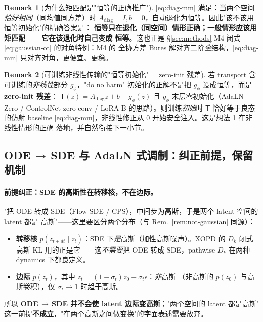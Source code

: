 \documentclass[11pt,a4paper]{article}
\newcommand{\Tmap}{\mathsf{T}}
\theoremstyle{definition}
\newtheorem{remark}{Remark}
\begin{document}
\begin{remark}[为什么矩匹配是"恒等的正确推广"]
\label{rem:mm-is-identity}
\eqref{eq:diag-mm} 满足：当两个空间\emph{恰好相同}（同均值同方差）时
$A_{\mathrm{diag}}=I,b=0$，自动退化为恒等。因此"该不该用恒等初始化"的精确答案是：
\textbf{恒等只在退化（同空间）情形正确；一般情形应该用矩匹配——它在该退化时自己变成
恒等}。这也正是 \S\ref{sec:methods} M4 闭式 \eqref{eq:gaussian-ot} 的对角特例：M4 的
全协方差 Bures 解对齐二阶\emph{全}结构，\eqref{eq:diag-mm} 只对齐对角，更便宜、更稳。
\end{remark}

\begin{remark}[可训练非线性传输的"恒等初始化" = zero-init 残差]
\label{rem:zero-init}
若 transport 含可训练的\emph{非线性}部分 $g_\phi$，"do no harm" 初始化的正解不是把
$g_\phi$ 设成恒等，而是 \textbf{zero-init 残差}：
$\Tmap(z)=A_{\mathrm{diag}}z+b+g_\phi(z)$ 且 $g_\phi$ 末层零初始化（AdaLN-Zero /
ControlNet zero-conv / LoRA-B 的思路）。则训练\emph{初始}时 $\Tmap$ 恰好等于良态的仿射
baseline \eqref{eq:diag-mm}，非线性修正从 0 开始安全注入。这是想法 1 在非线性情形的正确
落地，并自然衔接下一小节。
\end{remark}

\subsection{ODE\,$\to$\,SDE 与 AdaLN 式调制：纠正前提，保留机制}

\paragraph{前提纠正：SDE 的高斯性在转移核，不在边际。}
"把 ODE 转成 SDE（Flow-SDE / CPS），中间步为高斯，于是两个 latent 空间的 latent 都是
高斯"——这里要区分两个分布（与 Rem.~\ref{rem:not-gaussian} 同源）：
\begin{itemize}[leftmargin=1.5em]
\item \textbf{转移核} $p(z_{t+dt}\mid z_t)$：SDE 下\emph{是}高斯（加性高斯噪声）。XOPD 的
$D_k$ 闭式高斯 KL 用的正是它——这\emph{不需要}把 ODE 转成 SDE，pathwise $D_k$ 在两种
dynamics 下都良定义。
\item \textbf{边际} $p(z_t)$，其中 $z_t=(1-\sigma_t)z_0+\sigma_t\epsilon$：\emph{非}高斯
（非高斯的 $p(z_0)$ 与高斯卷积），仅 $\sigma_t\to1$ 时趋于高斯。
\end{itemize}
所以 \textbf{ODE\,$\to$\,SDE 并不会使 latent 边际变高斯}；"两个空间的 latent 都是高斯"
这一前提\textbf{不成立}，"在两个高斯之间做变换"的字面表述需要放弃。
\end{document}
